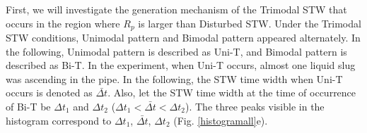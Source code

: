\documentclass[aps,pre,preprint,groupedaddress,showkeys]{revtex4-2}
\begin{document}
First, we will investigate the generation mechanism of the Trimodal STW that occurs in the region where $ R_p $ is larger than Disturbed STW.
Under the Trimodal STW conditions, Unimodal pattern and Bimodal pattern appeared alternately.
In the following, Unimodal pattern is described as Uni-T, and Bimodal pattern is described as Bi-T.
In the experiment, when Uni-T occurs, almost one liquid slug was ascending in the pipe.
In the following, the STW time width when Uni-T occurs is denoted as $ \bar {\Delta t} $.
Also, let the STW time width at the time of occurrence of Bi-T be $ \Delta t_1 $ and $ \Delta t_2 $ ($ \Delta t_1 <\bar {\Delta t} <\Delta t_2 $).
The three peaks visible in the histogram correspond to $ \Delta t_1 $, $ \bar {\Delta t} $, $ \Delta t_2 $ (Fig. \ref{histogramall}e).
\end{document}
